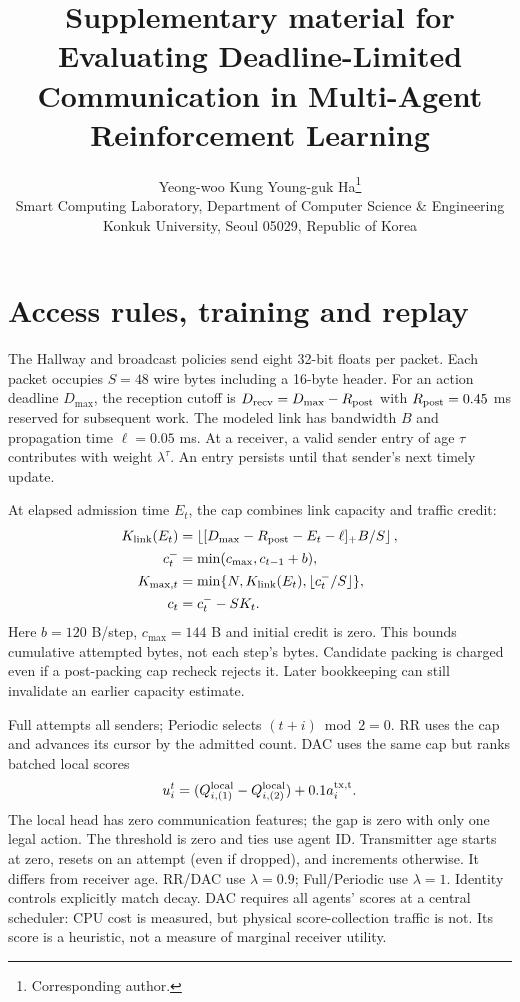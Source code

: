 \documentclass[11pt,a4paper]{article}
\title{Supplementary material for\\Evaluating Deadline-Limited Communication in Multi-Agent Reinforcement Learning}
\author{Yeong-woo Kung \quad Young-guk Ha\thanks{Corresponding author.}\\[3pt]
\small Smart Computing Laboratory, Department of Computer Science \& Engineering\\
\small Konkuk University, Seoul 05029, Republic of Korea}
\date{}
\begin{document}
\maketitle
\section{Access rules, training and replay}\label{app:settings}
The Hallway and broadcast policies send eight 32-bit floats per packet. Each packet occupies $S=48$ wire bytes including a 16-byte header. For an action deadline $D_{\max}$, the reception cutoff is $D_{\rm recv}=D_{\max}-R_{\rm post}$ with $R_{\rm post}=0.45$ ms reserved for subsequent work. The modeled link has bandwidth $B$ and propagation time $\ell=0.05$ ms. At a receiver, a valid sender entry of age $\tau$ contributes with weight $\lambda^\tau$. An entry persists until that sender's next timely update.

At elapsed admission time $E_t$, the cap combines link capacity and traffic credit:
\begin{align}
 K_{\rm link}(E_t)&=\left\lfloor [D_{\max}-R_{\rm post}-E_t-\ell]_+B/S\right\rfloor,\label{eq:cap}\\
 c_t^-&=\min(c_{\max},c_{t-1}+b),\nonumber\\ K_{\max,t}&=\min\{N,K_{\rm link}(E_t),\lfloor c_t^-/S\rfloor\},\\
 c_t&=c_t^- - SK_t.
\end{align}
Here $b=120$ B/step, $c_{\max}=144$ B and initial credit is zero. This bounds cumulative attempted bytes, not each step's bytes. Candidate packing is charged even if a post-packing cap recheck rejects it. Later bookkeeping can still invalidate an earlier capacity estimate.

Full attempts all senders; Periodic selects $(t+i)\bmod2=0$. RR uses the cap and advances its cursor by the admitted count. DAC uses the same cap but ranks batched local scores
\begin{equation}
 u_i^t=(Q_{i,(1)}^{\rm local}-Q_{i,(2)}^{\rm local})+0.1a_i^{\rm tx,t}.
\end{equation}
The local head has zero communication features; the gap is zero with only one legal action. The threshold is zero and ties use agent ID. Transmitter age starts at zero, resets on an attempt (even if dropped), and increments otherwise. It differs from receiver age. RR/DAC use $\lambda=0.9$; Full/Periodic use $\lambda=1$. Identity controls explicitly match decay. DAC requires all agents' scores at a central scheduler: CPU cost is measured, but physical score-collection traffic is not. Its score is a heuristic, not a measure of marginal receiver utility.
\end{document}
